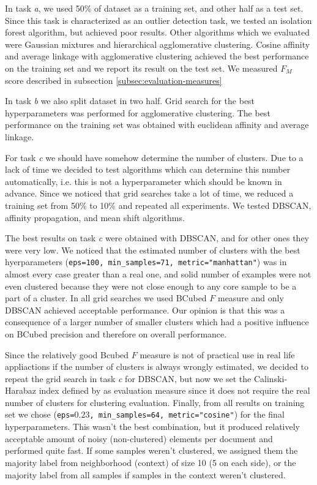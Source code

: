 \documentclass[10pt, a4paper]{article}
\begin{document}
In task \emph{a}, we used 50\% of dataset as a training set, and other half as a test set. Since this task is characterized as an outlier detection task, we tested an isolation forest algorithm, but achieved poor results. Other algorithms which we evaluated were Gaussian mixtures and hierarchical agglomerative clustering. Cosine affinity and average linkage with agglomerative clustering achieved the best performance on the training set and we report its result on the test set. We measured $F_M$ score described in subsection \ref{subsec:evaluation-measures}

In task \emph{b} we also split dataset in two half. Grid search for the best hyperparameters was performed for agglomerative clustering. The best performance on the training set was obtained with euclidean affinity and average linkage.

For task \emph{c} we should have somehow determine the number of clusters. Due to a lack of time we decided to test algorithms which can determine this number automatically, i.e. this is not a hyperparameter which should be known in advance. Since we noticed that grid searches take a lot of time, we reduced a training set from 50\% to 10\% and repeated all experiments. We tested DBSCAN, affinity propagation, and mean shift algorithms.

The best results on task \emph{c} were obtained with DBSCAN, and for other ones they were very low. We noticed that the estimated number of clusters with the best hyerparameters (\texttt{eps=100, min\_samples=71, metric="manhattan"}) was in almost every case greater than a real one, and solid number of examples were not even clustered because they were not close enough to any core sample to be a part of a cluster. In all grid searches we used BCubed $F$ measure and only DBSCAN achieved acceptable performance. Our opinion is that this was a consequence of a larger number of smaller clusters which had a positive influence on BCubed precision and therefore on overall performance.
 
Since the relatively good Bcubed $F$ measure is not of practical use in real life appliactions if the number of clusters is always wrongly estimated, we decided to repeat the grid search in task \emph{c} for DBSCAN, but now we set the Calinski-Harabaz index defined by \citet{calinski-1974} as evaluation measure since it does not require the real number of clusters for clustering evaluation. Finally, from all results on training set we chose (\texttt{eps=$0.23$, min\_samples=64, metric="cosine"}) for the final hyperparameters. This wasn't the best combination, but it produced relatively acceptable amount of noisy (non-clustered) elements per document and performed quite fast. If some samples weren't clustered, we assigned them the majority label from neighborhood (context) of size 10 (5 on each side), or the majority label from all samples if samples in the context weren't  clustered.  
\end{document}
